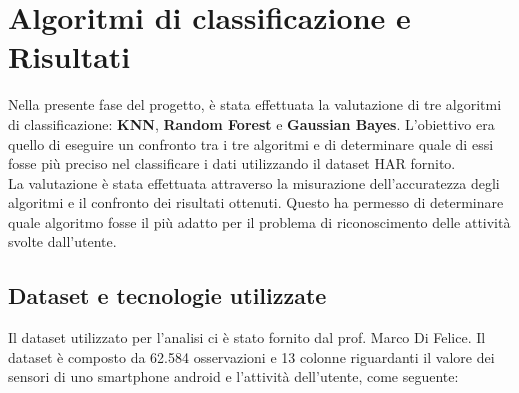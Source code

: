 \documentclass[../../Report.tex]{subfiles}
\begin{document}
\chapter{Algoritmi di classificazione e Risultati}
Nella presente fase del progetto, è stata effettuata la valutazione di tre algoritmi di classificazione: \textbf{KNN}, \textbf{Random Forest} e \textbf{Gaussian Bayes}. L'obiettivo era quello di eseguire un confronto tra i tre algoritmi e di determinare quale di essi fosse più preciso nel classificare i dati utilizzando il dataset HAR fornito.\\
La valutazione è stata effettuata attraverso la misurazione dell'accuratezza degli algoritmi e il confronto dei risultati ottenuti. Questo ha permesso di determinare quale algoritmo fosse il più adatto per il problema di riconoscimento delle attività svolte dall'utente.\\   

\section{Dataset e tecnologie utilizzate}
Il dataset utilizzato per l'analisi ci è stato fornito dal prof. Marco Di Felice. Il dataset è composto da 62.584 osservazioni e 13 colonne riguardanti il valore dei sensori di uno smartphone android e l'attività dell'utente, come seguente:
\end{document}
